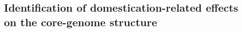 \documentclass[10pt,letterpaper]{article}
\begin{document}


% 





\subsection*{Identification of domestication-related effects on the core-genome structure}

\end{document}
